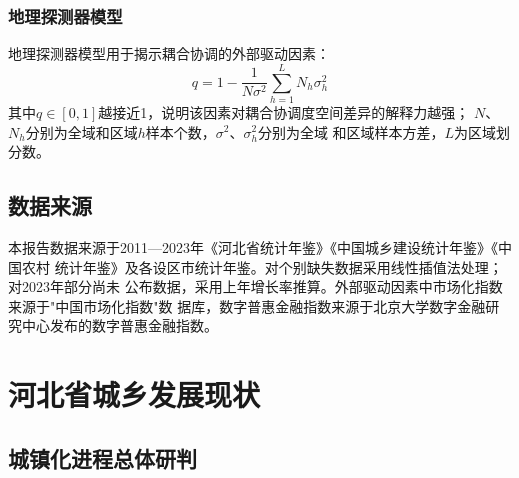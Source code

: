 \documentclass[12pt, a4paper, twoside]{ctexart}
\begin{document}
\subsubsection{地理探测器模型}

地理探测器模型用于揭示耦合协调的外部驱动因素\cite{zhao2026}：
\begin{equation}
  q = 1 - \frac{1}{N\sigma^2}\sum_{h=1}^{L} N_h \sigma_h^2
  \label{eq:geodetect}
\end{equation}
其中$q\in[0,1]$越接近1，说明该因素对耦合协调度空间差异的解释力越强；
$N$、$N_h$分别为全域和区域$h$样本个数，$\sigma^2$、$\sigma_h^2$分别为全域
和区域样本方差，$L$为区域划分数。

\subsection{数据来源}

本报告数据来源于2011—2023年《河北省统计年鉴》《中国城乡建设统计年鉴》《中国农村
统计年鉴》及各设区市统计年鉴。对个别缺失数据采用线性插值法处理；对2023年部分尚未
公布数据，采用上年增长率推算。外部驱动因素中市场化指数来源于"中国市场化指数"数
据库，数字普惠金融指数来源于北京大学数字金融研究中心发布的数字普惠金融指数。

\section{河北省城乡发展现状}

\subsection{城镇化进程总体研判}
\end{document}
